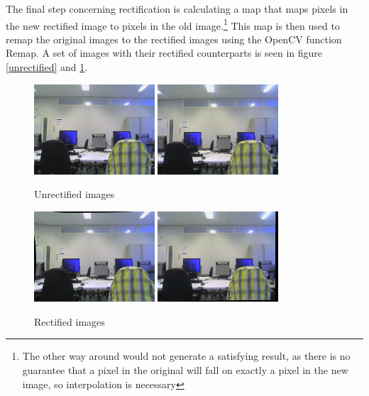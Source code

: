 \documentclass[a4paper]{article}
\begin{document}
The final step concerning rectification is calculating a map that maps
pixels in the new rectified image to pixels in the old
image.\footnote{The other way around would not generate a satisfying
result, as there is no guarantee that a pixel in the original will
fall on exactly a pixel in the new image, so interpolation is
necessary} This map is then used to remap the original images to the
rectified images using the OpenCV function Remap. A set of images with
their rectified counterparts is seen in figure \ref{unrectified} and
\ref{rectified}.

\begin{figure}[h] \centering
  \includegraphics[width=0.4\textwidth]{leftown}
  \includegraphics[width=0.4\textwidth]{rightown}
  \caption{Unrectified images}
  \label{unrectified}

  \includegraphics[width=0.4\textwidth]{leftownr}
  \includegraphics[width=0.4\textwidth]{rightownr}
  \caption{Rectified images}
  \label{rectified}
\end{figure} \newpage
\end{document}
